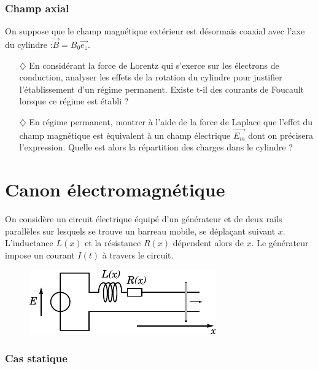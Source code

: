 \documentclass{report}
\begin{document}
\subsubsection*{Champ axial}

	On suppose que le champ magnétique extérieur est désormais coaxial avec l'axe du cylindre :$\vec{B}=B_{0}\vec{e_{z}}$.
	
	\begin{itemize}
	
		\item[$\diamondsuit$] En considérant la force de Lorentz qui s'exerce sur les électrons de conduction, analyser les effets de la rotation du cylindre pour justifier l'établissement d'un régime permanent. Existe t-il des courants de Foucault lorsque ce régime est établi ? 
		
	\item[$\diamondsuit$] En régime permanent, montrer à l'aide de la force de Laplace que l'effet du champ magnétique est équivalent à un champ électrique $\vec{E_m}$ dont on précisera l'expression. Quelle est alors la répartition des charges dans le cylindre ?
	
	\end{itemize}


\newpage

\section*{Canon électromagnétique}

On considère un circuit électrique équipé d'un générateur et de deux rails parallèles sur lesquels se trouve un barreau mobile, se déplaçant suivant $x$. L'inductance $L(x)$ et la résistance $R(x)$ dépendent alors de $x$. Le générateur impose un courant $I(t)$ à travers le circuit. 

\begin{figure}[h!]
\centering
		\includegraphics[scale=1]{induction1.pdf}
\end{figure}

\subsubsection*{Cas statique}
\end{document}
